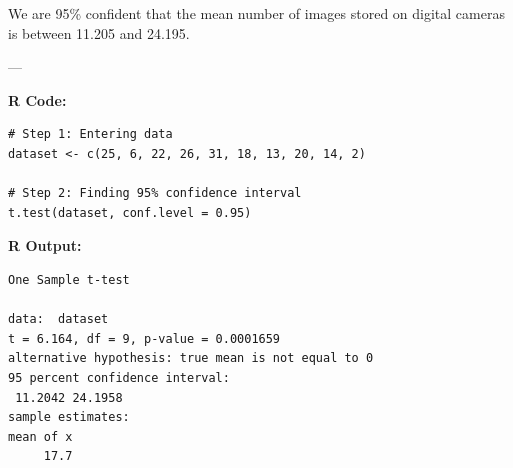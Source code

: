 \begin{example}
We are 95\% confident that the mean number of images stored on digital cameras is between 11.205 and 24.195.

---

\textbf{R Code:}

\begin{verbatim}
# Step 1: Entering data
dataset <- c(25, 6, 22, 26, 31, 18, 13, 20, 14, 2)

# Step 2: Finding 95% confidence interval
t.test(dataset, conf.level = 0.95)
\end{verbatim}

\textbf{R Output:}

\begin{verbatim}
One Sample t-test

data:  dataset
t = 6.164, df = 9, p-value = 0.0001659
alternative hypothesis: true mean is not equal to 0
95 percent confidence interval:
 11.2042 24.1958
sample estimates:
mean of x 
     17.7 
\end{verbatim}
\end{example}
